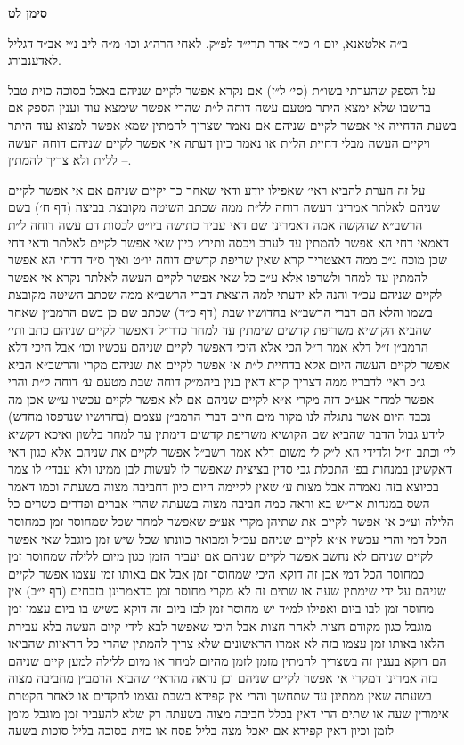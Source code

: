 \documentclass[12pt, openany]{book}
\newcommand{\chapname}{}
\newcommand{\newchap}[1]{
	\addcontentsline{toc}{chapter}{#1}
	\renewcommand{\chapname}{#1}
		\begin{center}
			\textbf{%
\fontsize{16pt}{16pt}\selectfont
				#1}
		\end{center}
}
\begin{document}
\newchap{סימן לט}
\begin{multicols}{2}
ב״ה אלטאנא, יום ו׳ כ״ד אדר תרי״ד לפ״ק. לאחי הרה״ג וכו׳ מ״ה ליב נ״י אב״ד דגליל לאדענבורג.\\\vspace{0pt}

על הספק שהערתי בשו״ת (סי׳ ל״ז) אם נקרא אפשר לקיים שניהם באכל בסוכה כזית טבל בחשבו שלא ימצא היתר מטעם עשה דוחה ל״ת שהרי אפשר שימצא עוד וענין הספק אם בשעת הדחייה אי אפשר לקיים שניהם אם נאמר שצריך להמתין שמא אפשר למצוא עוד היתר ויקיים העשה מבלי דחיית הל״ת או נאמר כיון דעתה אי אפשר לקיים שניהם דוחה העשה לל״ת ולא צריך להמתין –.\\\vspace{0pt}

על זה הערת להביא ראי׳ שאפילו יודע ודאי שאחר כך יקיים שניהם אם אי אפשר לקיים שניהם לאלתר אמרינן דעשה דוחה לל״ת ממה שכתב השיטה מקובצת בביצה (דף ח׳) בשם הרשב״א שהקשה אמה דאמרינן שם דאי עביד כתישה ביו״ט לכסות דם עשה דוחה ל״ת דאמאי דחי הא אפשר להמתין עד לערב ויכסה ותירץ כיון שאי אפשר לקיים לאלתר ודאי דחי שכן מוכח ג״כ ממה דאצטריך קרא שאין שריפת קדשים דוחה יו״ט ואיך ס״ד דדחי הא אפשר להמתין עד למחר ולשרפו אלא ע״כ כל שאי אפשר לקיים העשה לאלתר נקרא אי אפשר לקיים שניהם עכ״ד והנה לא ידעתי למה הוצאת דברי הרשב״א ממה שכתב השיטה מקובצת בשמו והלא הם דברי הרשב״א בחדושיו שבת (דף כ״ד) שכתב שם כן בשם הרמב״ן שאחר שהביא הקושיא משריפת קדשים שימתין עד למחר כדר״ל דאפשר לקיים שניהם כתב ותי׳ הרמב״ן ז״ל דלא אמר ר״ל הכי אלא היכי דאפשר לקיים שניהם עכשיו וכו׳ אבל היכי דלא אפשר לקיים העשה היום אלא בדחיית ל״ת אי אפשר לקיים את שניהם מקרי והרשב״א הביא ג״כ ראי׳ לדבריו ממה דצריך קרא דאין בנין ביהמ״ק דוחה שבת מטעם ע׳ דוחה ל״ת והרי אפשר למחר אע״כ דזה מקרי א״א לקיים שניהם אם לא אפשר לקיים עכשיו ע״ש אכן מה נכבד היום אשר נתגלה לנו מקור מים חיים דברי הרמב״ן עצמם (בחדושיו שנדפסו מחדש) לידע גבול הדבר שהביא שם הקושיא משריפת קדשים דימתין עד למחר בלשון ואיכא דקשיא לי׳ וכתב וז״ל ולדידי הא ל״ק לי משום דלא אמר רשב״ל אפשר לקיים את שניהם אלא כגון האי דאקשינן במנחות בפ׳ התכלת גבי סדין בציצית שאפשר לו לעשות לבן ממינו ולא עבדי׳ לו צמר בכיוצא בזה נאמרה אבל מצות ע׳ שאין לקיימה היום כיון דחביבה מצוה בשעתה וכמו דאמר השס במנחות אר״ש בא וראה כמה חביבה מצוה בשעתה שהרי אברים ופדרים כשרים כל הלילה וע״כ אי אפשר לקיים את שתיהן מקרי אע״פ שאפשר למחר שכל שמחוסר זמן כמחוסר הכל דמי והרי עכשיו א״א לקיים שניהם עכ״ל ומבואר כוונתו שכל שיש זמן מוגבל שאי אפשר לקיים שניהם לא נחשב אפשר לקיים שניהם אם יעביר הזמן כגון מיום ללילה שמחוסר זמן כמחוסר הכל דמי אכן זה דוקא היכי שמחוסר זמן אבל אם באותו זמן עצמו אפשר לקיים שניהם על ידי שימתין שעה או שתים זה לא מקרי מחוסר זמן כדאמרינן בזבחים (דף י״ב) אין מחוסר זמן לבו ביום ואפילו למ״ד יש מחוסר זמן לבו ביום זה דוקא כשיש בו ביום עצמו זמן מוגבל כגון מקודם חצות לאחר חצות אבל היכי שאפשר לבא לידי קיום העשה בלא עבירת הלאו באותו זמן עצמו בזה לא אמרו הראשונים שלא צריך להמתין שהרי כל הראיות שהביאו הם דוקא בענין זה בשצריך להמתין מזמן לזמן מהיום למחר או מיום ללילה למען קיים שניהם בזה אמרינן דמקרי אי אפשר לקיים שניהם וכן נראה מהראי׳ שהביא הרמב״ן מחביבה מצוה בשעתה שאין ממתינן עד שתחשך והרי אין קפידא בשבת עצמו להקדים או לאחר הקטרת אימורין שעה או שתים הרי דאין בכלל חביבה מצוה בשעתה רק שלא להעביר זמן מוגבל מזמן לזמן וכיון דאין קפידא אם יאכל מצה בליל פסח או כזית בסוכה בליל סוכות בשעה 
\end{multicols}
\end{document}
